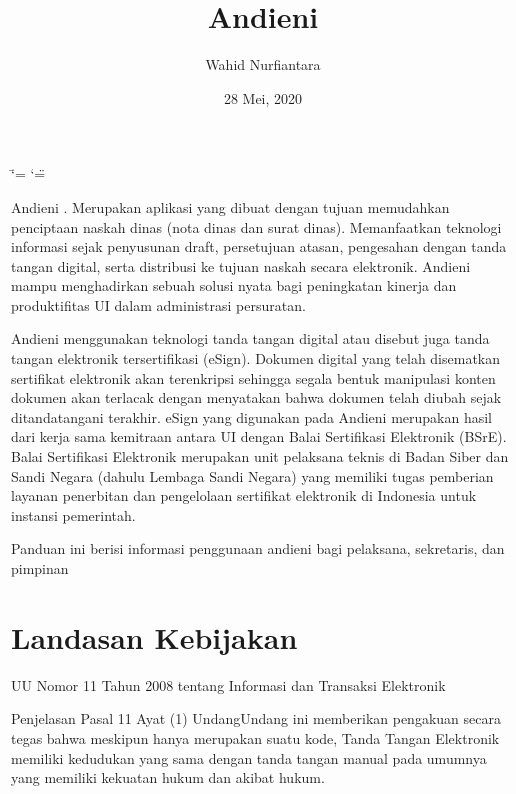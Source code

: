 \documentclass[letterpaper,10pt,bahasai]{sphinxmanual}
\title{Andieni}
\date{28 Mei, 2020}
\author{Wahid Nurfiantara}
\begin{document}
\ifdefined\shorthandoff
  \ifnum\catcode`\=\string=\active\shorthandoff{=}\fi
  \ifnum\catcode`\"=\active{}\fi
\fi

\pagestyle{empty}
\sphinxmaketitle
\pagestyle{plain}
\sphinxtableofcontents
\pagestyle{normal}
\label{\detokenize{index::doc}}

\begin{quote}

\noindent{}
\end{quote}

Andieni \sphinxhyphen{} . Merupakan aplikasi yang dibuat dengan tujuan
memudahkan penciptaan naskah dinas (nota dinas dan surat dinas). Memanfaatkan teknologi informasi sejak penyusunan
draft, persetujuan atasan, pengesahan dengan tanda tangan digital, serta distribusi ke tujuan naskah secara elektronik.
Andieni mampu menghadirkan sebuah solusi nyata bagi peningkatan kinerja dan produktifitas UI dalam administrasi persuratan.

Andieni menggunakan teknologi tanda tangan digital atau disebut juga tanda tangan elektronik tersertifikasi (eSign).
Dokumen digital yang telah disematkan sertifikat elektronik akan terenkripsi sehingga segala bentuk manipulasi konten
dokumen akan terlacak dengan menyatakan bahwa dokumen telah diubah sejak ditandatangani terakhir. eSign yang digunakan
pada Andieni merupakan hasil dari kerja sama kemitraan antara UI dengan Balai Sertifikasi Elektronik (BSrE).
Balai Sertifikasi Elektronik merupakan unit pelaksana teknis di Badan Siber dan Sandi Negara (dahulu Lembaga Sandi Negara)
yang memiliki tugas pemberian layanan penerbitan dan pengelolaan sertifikat elektronik di Indonesia untuk instansi pemerintah.

Panduan ini berisi informasi penggunaan andieni bagi pelaksana, sekretaris, dan pimpinan


\chapter{Landasan Kebijakan}
\label{\detokenize{Kebijakan:landasan-kebijakan}}\label{\detokenize{Kebijakan::doc}}
 UU Nomor 11 Tahun 2008 tentang Informasi dan Transaksi Elektronik

\begin{sphinxVerbatim}[commandchars=\\\{\},numbers=left,firstnumber=1,stepnumber=1]
Penjelasan
   Pasal 11
      Ayat (1)
         Undang\PYGZhy{}Undang ini memberikan pengakuan secara tegas bahwa meskipun hanya merupakan
         suatu kode, Tanda Tangan Elektronik memiliki kedudukan yang sama dengan tanda
         tangan manual pada umumnya yang memiliki kekuatan hukum dan akibat hukum.
\end{sphinxVerbatim}
\end{document}
